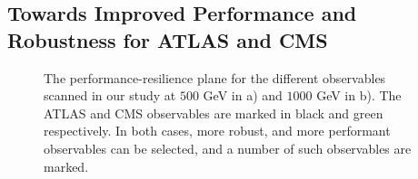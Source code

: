 \documentclass[11pt,letterpaper]{article}
\begin{document}
\subsection{Towards Improved Performance and Robustness for ATLAS and CMS}\label{sec:exp_compare}


\begin{figure}
\begin{center}
\qquad
{}
\end{center}
\caption{The performance-resilience plane for the different observables scanned in our study at $500$ GeV in a) and $1000$ GeV in b). The ATLAS and CMS observables are marked in black and green respectively. In both cases, more robust, and more performant observables can be selected, and a number of such observables are marked.
}
\label{fig:phasespace}
\end{figure}
\end{document}
